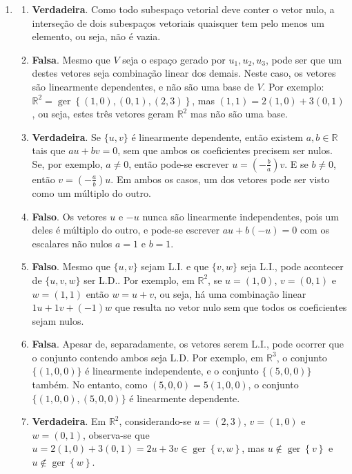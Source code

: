 \documentclass[12pt,a4paper]{article}
\newcommand*\ger[1]{\operatorname{ger}\left\{#1\right\}}
\newcommand*\R{\mathbb{R}}
\begin{document}
\begin{enumerate}
\item
\begin{enumerate}
\item \textbf{Verdadeira}. Como todo subespaço vetorial deve conter o vetor nulo, a interseção de dois subespaços vetoriais quaisquer tem pelo menos um elemento, ou seja, não é vazia.
\item \textbf{Falsa}. Mesmo que $V$ seja o espaço gerado por ${ u_1, u_2, u_3 }$, pode ser que um destes vetores seja combinação linear dos demais. Neste caso, os vetores são linearmente dependentes, e não são uma base de $V$. Por exemplo: $\R^2 = \ger{(1,0),(0,1),(2,3)}$, mas $(1,1) = 2(1,0)+3(0,1)$, ou seja, estes três vetores geram $\R^2$ mas não são uma base.
\item \textbf{Verdadeira}. Se $\{u, v\}$ é linearmente dependente, então existem $a,b \in \R$ tais que $au+bv = 0$, sem que ambos os coeficientes precisem ser nulos. Se, por exemplo, $a \neq 0$, então pode-se escrever $u = (-\frac{b}{a}) v$. E se $b \neq 0$, então $v = (-\frac{a}{b}) u$. Em ambos os casos, um dos vetores pode ser visto como um múltiplo do outro.

\item \textbf{Falso}. Os vetores $u$ e $-u$ nunca são linearmente independentes, pois um deles é múltiplo do outro, e pode-se escrever $au + b(-u) = 0$ com os escalares não nulos $a=1$ e $b=1$.

\item \textbf{Falso}. Mesmo que $\{u, v\}$ sejam L.I. e que $\{ v, w \}$ seja L.I., pode acontecer de $\{u, v, w \}$ ser L.D.. Por exemplo, em $\R^2$, se $u = (1,0)$, $v = (0,1)$ e $w = (1, 1)$ então $w = u + v$, ou seja, há uma combinação linear $1u+1v+(-1)w$ que resulta no vetor nulo sem que todos os coeficientes sejam nulos.
\item \textbf{Falsa}. Apesar de, separadamente, os vetores serem L.I., pode ocorrer que o conjunto contendo ambos seja L.D. Por exemplo, em $\R^3$, o conjunto $\{ (1,0,0) \}$ é linearmente independente, e o conjunto $\{ (5,0,0) \}$ também. No entanto, como $(5,0,0) = 5 (1,0,0)$, o conjunto $\{ (1,0,0), (5,0,0) \}$ é linearmente dependente.
\item \textbf{Verdadeira}. Em $\R^2$, considerando-se $u=(2,3)$, $v = (1,0)$ e $w = (0,1)$, observa-se que $u = 2(1,0)+3(0,1) = 2u+3v \in \ger{v,w}$, mas $u \not \in \ger{v}$ e $u \not \in \ger{w}$.
\end{enumerate}


\end{enumerate}
\end{document}
